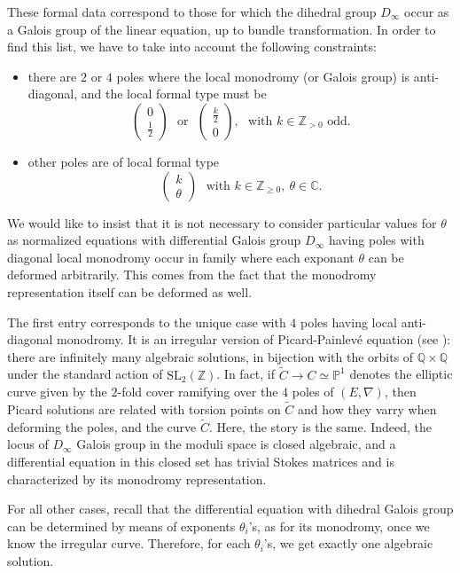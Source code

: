 \documentclass[12]{amsart}
\newcommand{\SL}{\mathrm{SL}_2}
\begin{document}
These formal data correspond to those for which the dihedral group $D_\infty$ occur
as a Galois group of the linear equation, up to bundle transformation. In order to find this list,
we have to take into account the following constraints:
\begin{itemize}
\item there are $2$ or $4$ poles where the local monodromy (or Galois group) is anti-diagonal,
and the local formal type must be
$$\begin{pmatrix}0\\ \frac{1}{2}\end{pmatrix}
\ \ \ \text{or}\ \ \ \begin{pmatrix}\frac{k}{2}\\ 0\end{pmatrix},\ \ \ \text{with }k\in\mathbb Z_{>0}\text{ odd.}$$
\item other poles are of local formal type
$$\begin{pmatrix}k\\ \theta\end{pmatrix}\ \ \ \text{with }k\in\mathbb Z_{\ge0},\ \theta\in\mathbb C.$$
\end{itemize}
We would like to insist that it is not necessary to consider particular values for $\theta$ as normalized equations 
with differential Galois group $D_\infty$ having poles with diagonal local monodromy occur in family where
each exponant $\theta$ can be deformed arbitrarily. This comes from the fact that the monodromy representation
itself can be deformed as well.



The first entry corresponds to the unique case with $4$ poles having local anti-diagonal monodromy.
It is an irregular version of Picard-Painlev\'e equation (see \cite{MazzoccoPicard,LPU}): 
there are infinitely many algebraic solutions, in bijection with the orbits of $\mathbb Q\times\mathbb Q$
under the standard action of $\SL(\mathbb Z)$. In fact, if $\tilde C\to C\simeq\mathbb P^1$ denotes the elliptic curve
given by the $2$-fold cover ramifying over the $4$ poles of $(E,\nabla)$, then Picard solutions are related with 
torsion points on $\tilde C$ and how they varry when deforming the poles, and the curve $\tilde C$.
Here, the story is the same. Indeed, the locus of $D_\infty$ Galois group in the moduli space is closed algebraic,
and a differential equation in this closed set has trivial Stokes matrices and is characterized by its monodromy
representation.

For all other cases, recall that the differential equation with dihedral Galois group can be determined
by means of exponents $\theta_i$'s, as for its monodromy, once we know the irregular curve. Therefore,
for each $\theta_i$'s, we get exactly one algebraic solution.
\end{document}
